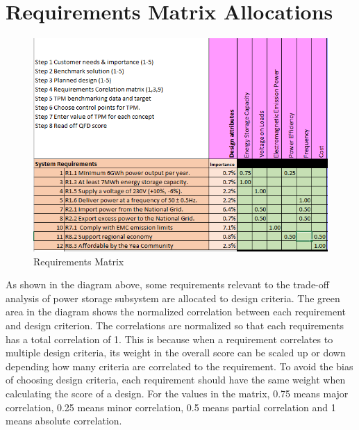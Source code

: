 \documentclass{article}
\begin{document}
\section{Requirements Matrix Allocations}
\begin{figure}[H]
\label{al}
\center
\includegraphics[scale=0.8]{allocation}
\caption{Requirements Matrix}
\end{figure}
As shown in the diagram above, some requirements relevant to the trade-off analysis of power storage subsystem are allocated to design criteria. The green area in the diagram shows the normalized correlation between each requirement and design criterion. The correlations are normalized so that each requirements has a total correlation of 1. This is because when a requirement correlates to multiple design criteria, its weight in the overall score can be scaled up or down depending how many criteria are correlated to the requirement. To avoid the bias of choosing design criteria, each requirement should have the same weight when calculating the score of a design. For the values in the matrix, 0.75 means major correlation, 0.25 means minor correlation, 0.5 means partial correlation and 1 means absolute correlation.\\
\\
\end{document}
